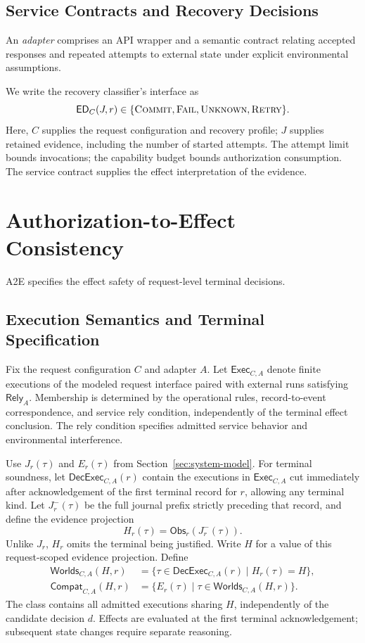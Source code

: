 \documentclass[acmsmall,screen,review,anonymous]{acmart}
\newcommand{\Unknown}{\textsc{Unknown}\xspace}
\newcommand{\Commit}{\textsc{Commit}\xspace}
\newcommand{\Fail}{\textsc{Fail}\xspace}
\newcommand{\Retry}{\textsc{Retry}\xspace}
\begin{document}
\subsection{Service Contracts and Recovery Decisions}

An \emph{adapter} comprises an API wrapper and a semantic contract
relating accepted responses and repeated attempts to external state
under explicit environmental assumptions.

We write the recovery classifier's interface as
\[
  \mathsf{ED}_C(J,r)
  \in
  \{\Commit,\Fail,\Unknown,\Retry\}.
\]
Here, $C$ supplies the request configuration and recovery profile;
$J$ supplies retained evidence, including the number of started attempts.
The attempt limit bounds invocations; the capability budget bounds
authorization consumption. The service contract supplies the effect
interpretation of the evidence.

\section{Authorization-to-Effect Consistency}
\label{sec:contract}

A2E specifies the effect safety of request-level terminal decisions.

\subsection{Execution Semantics and Terminal Specification}

Fix the request configuration $C$ and adapter $A$. Let
$\mathsf{Exec}_{C,A}$ denote finite executions of the modeled request
interface paired with external runs satisfying $\mathsf{Rely}_A$.
Membership is determined by the operational rules, record-to-event
correspondence, and service rely condition, independently of the terminal
effect conclusion. The rely condition specifies admitted service behavior
and environmental interference.

Use $J_r(\tau)$ and $E_r(\tau)$ from Section~\ref{sec:system-model}. For terminal
soundness, let $\mathsf{DecExec}_{C,A}(r)$ contain the executions in
$\mathsf{Exec}_{C,A}$ cut immediately after acknowledgement of the
first terminal record for $r$, allowing any terminal kind. Let
$J^{-}_r(\tau)$ be the full journal prefix strictly preceding that
record, and define the evidence projection
\[
  H_r(\tau)=\mathsf{Obs}_r(J^{-}_r(\tau)).
\]
Unlike $J_r$, $H_r$ omits the terminal being justified. Write $H$ for
a value of this request-scoped evidence projection. Define
\[
\begin{aligned}
\mathsf{Worlds}_{C,A}(H,r)
  &=\{\tau\in\mathsf{DecExec}_{C,A}(r)\mid H_r(\tau)=H\},\\
\mathsf{Compat}_{C,A}(H,r)
  &=\{E_r(\tau)\mid\tau\in\mathsf{Worlds}_{C,A}(H,r)\}.
\end{aligned}
\]
The class contains all admitted executions sharing $H$, independently of
the candidate decision $d$. Effects are evaluated at the first terminal
acknowledgement; subsequent state changes require separate reasoning.
\end{document}
